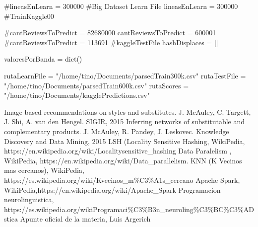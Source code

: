 \documentclass[a4paper,10pt]{article}
\begin{document}
	#lineasEnLearn = 300000					#Big Dataset Learn File
	lineasEnLearn = 300000 #TrainKaggle00
	
	#cantReviewsToPredict = 82680000
	cantReviewsToPredict = 600001 
	#cantReviewsToPredict = 113691 #kaggleTestFile
	hashDisplaces = []
	
	valoresPorBanda = dict()
	
	rutaLearnFile = "/home/tino/Documents/parsedTrain300k.csv"
	rutaTestFile = "/home/tino/Documents/parsedTrain600k.csv"
	rutaScores = "/home/tino/Documents/kagglePredictions.csv"
	
	
	

	
	\begin{thebibliography}{99}
		 Image-based recommendations on styles and substitutes. J. McAuley, C. Targett, J. Shi, A. van den Hengel. SIGIR, 2015
		 Inferring networks of substitutable and complementary products. J. McAuley, R. Pandey, J. Leskovec. Knowledge Discovery and Data Mining, 2015
		 LSH (Locality Sensitive Hashing, WikiPedia, https://en.wikipedia.org/wiki/Locality\-sensitive\_hashing
		 Data Paralelism , WikiPedia, https://en.wikipedia.org/wiki/Data\_parallelism.
		 KNN (K Vecinos mas cercanos), WikiPedia, https://es.wikipedia.org/wiki/K\-vecinos\_m\%C3\%A1s\_cercano
		 Apache Spark, WikiPedia,https://en.wikipedia.org/wiki/Apache\_Spark
		 Programacion neurolinguistica, https://es.wikipedia.org/wikiProgramaci\%C3\%B3n\_neuroling\%C3\%BC\%C3\%ADstica
		 Apunte oficial de la materia, Luis Argerich

	\end{thebibliography}
	
\end{document}
